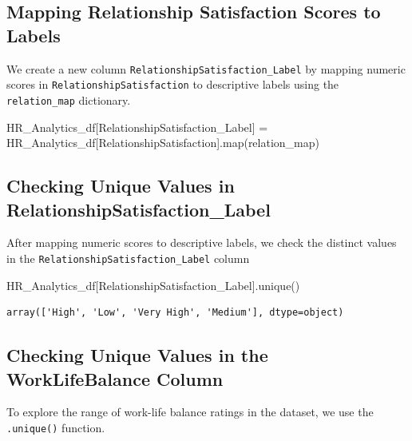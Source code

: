 \documentclass[
  letterpaper,
  DIV=11,
  numbers=noendperiod]{scrartcl}
\newenvironment{Shaded}{\begin{snugshade}}{\end{snugshade}}
\newcommand{\BuiltInTok}[1]{\textcolor[rgb]{0.00,0.23,0.31}{#1}}
\newcommand{\NormalTok}[1]{\textcolor[rgb]{0.00,0.23,0.31}{#1}}
\newcommand{\OperatorTok}[1]{\textcolor[rgb]{0.37,0.37,0.37}{#1}}
\newcommand{\StringTok}[1]{\textcolor[rgb]{0.13,0.47,0.30}{#1}}
\begin{document}
\subsection{Mapping Relationship Satisfaction Scores to
Labels}\label{mapping-relationship-satisfaction-scores-to-labels}

We create a new column \texttt{RelationshipSatisfaction\_Label} by
mapping numeric scores in \texttt{RelationshipSatisfaction} to
descriptive labels using the \texttt{relation\_map} dictionary.

\begin{Shaded}
\begin{Highlighting}[]
\NormalTok{HR\_Analytics\_df[}\StringTok{\textquotesingle{}RelationshipSatisfaction\_Label\textquotesingle{}}\NormalTok{] }\OperatorTok{=}\NormalTok{ HR\_Analytics\_df[}\StringTok{\textquotesingle{}RelationshipSatisfaction\textquotesingle{}}\NormalTok{].}\BuiltInTok{map}\NormalTok{(relation\_map)}
\end{Highlighting}
\end{Shaded}

\subsection{Checking Unique Values in
RelationshipSatisfaction\_Label}\label{checking-unique-values-in-relationshipsatisfaction_label}

After mapping numeric scores to descriptive labels, we check the
distinct values in the \texttt{RelationshipSatisfaction\_Label} column

\begin{Shaded}
\begin{Highlighting}[]
\NormalTok{HR\_Analytics\_df[}\StringTok{\textquotesingle{}RelationshipSatisfaction\_Label\textquotesingle{}}\NormalTok{].unique()}
\end{Highlighting}
\end{Shaded}

\begin{verbatim}
array(['High', 'Low', 'Very High', 'Medium'], dtype=object)
\end{verbatim}

\subsection{Checking Unique Values in the WorkLifeBalance
Column}\label{checking-unique-values-in-the-worklifebalance-column}

To explore the range of work-life balance ratings in the dataset, we use
the \texttt{.unique()} function.
\end{document}
